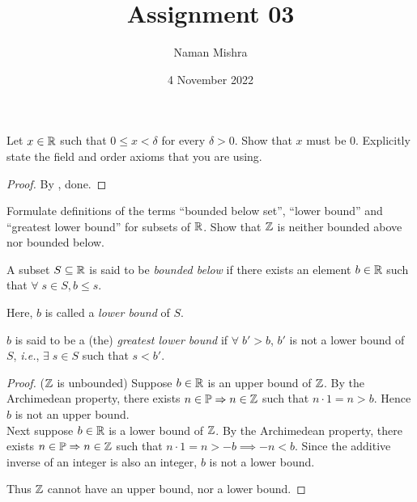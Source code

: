 \documentclass[12pt]{article}
\title{Assignment 03}
\author{Naman Mishra}
\date{4 November 2022}
\begin{document}
\maketitle

\begin{problem}
    Let $x \in \mathbb{R}$ such that $0 \leq x < \delta$ for every $\delta > 0$.
    Show that $x$ must be 0. Explicitly state the field and order axioms that you are using.
\end{problem}
\begin{proof}
    By , done.
\end{proof}
%
%

\begin{problem}
    Formulate  definitions  of  the  terms  ``bounded  below  set'',  ``lower  bound''  and ``greatest lower bound'' for subsets of $\mathbb{R}$.
    Show that $\mathbb{Z}$ is neither bounded above nor bounded below.
\end{problem}
\begin{defn} \label{defn:bounds:lower}
    A subset $S \subseteq \mathbb{R}$ is said to be \emph{bounded below} if there exists an element $b \in \mathbb{R}$ such that $\forall\; s \in S, b \leq s$.

    Here, $b$ is called a \emph{lower bound} of $S$.

    $b$ is said to be a (the) \emph{greatest lower bound} if $\forall\; b' > b$, $b'$ is not a lower bound of $S$, \textit{i.e.}, $\exists\; s \in S$ such that $s < b'$.
\end{defn}
\begin{proof}
    ($\mathbb{Z}$ is unbounded) Suppose $b \in \mathbb{R}$ is an upper bound of $\mathbb{Z}$. By the Archimedean property, there exists $n \in \mathbb{P} \Rightarrow n \in \mathbb{Z}$ such that $n\cdot 1 = n > b$. Hence $b$ is not an upper bound. \\
    Next suppose $b \in \mathbb{R}$ is a lower bound of $\mathbb{Z}$. By the Archimedean property, there exists $n \in \mathbb{P} \Rightarrow n \in \mathbb{Z}$ such that $n \cdot 1 = n > -b \implies -n < b$. Since the additive inverse of an integer is also an integer, $b$ is not a lower bound.

    Thus $\mathbb{Z}$ cannot have an upper bound, nor a lower bound.
\end{proof}
\end{document}
